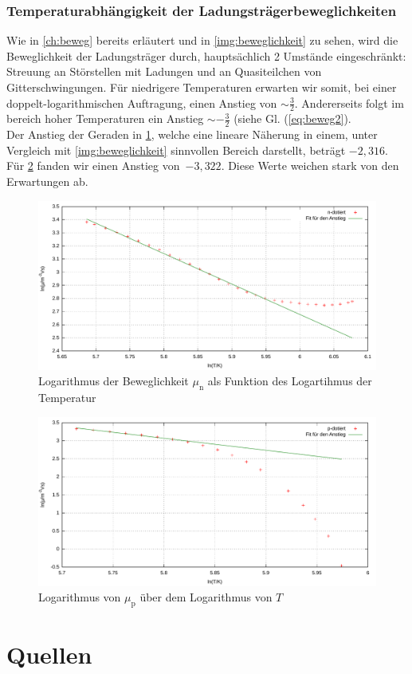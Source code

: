 \documentclass[numbers=noenddot,12pt,a4paper]{scrartcl}
\newcommand{\ix}[1]{_\text{#1}}
\begin{document}
\subsubsection{Temperaturabhängigkeit der Ladungsträgerbeweglichkeiten}
Wie in \ref{ch:beweg} bereits erläutert und in \ref{img:beweglichkeit} zu sehen, wird die Beweglichkeit der Ladungsträger durch, hauptsächlich 2 Umstände eingeschränkt: Streuung an Störstellen mit Ladungen und an Quasiteilchen von Gitterschwingungen. Für niedrigere Temperaturen erwarten wir somit, bei einer doppelt-logarithmischen Auftragung, einen Anstieg von $\sim\frac{3}{2}$. Andererseits folgt im bereich hoher Temperaturen ein Anstieg $\sim-\frac{3}{2}$ (siehe Gl. (\ref{eq:beweg2}).\\
Der Anstieg der Geraden in \ref{img:mu-n}, welche eine lineare Näherung in einem, unter Vergleich mit \ref{img:beweglichkeit} sinnvollen Bereich darstellt, beträgt $-2,316$. Für \ref{img:mu-p} fanden wir einen Anstieg \mbox{von $-3,322$.} Diese Werte weichen stark von den Erwartungen ab.
\begin{figure}[H]
	\includegraphics[width=\textwidth]{messwerte/beweglichkeitn.pdf}
	\caption{Logarithmus der Beweglichkeit $\mu\ix{n}$ als Funktion des Logartihmus der Temperatur} \label{img:mu-n}
\end{figure}
\begin{figure}[H]
	\includegraphics[width=\textwidth]{messwerte/beweglichkeitp.pdf}
	\caption{Logarithmus von $\mu\ix{p}$ über dem Logarithmus von $T$} \label{img:mu-p}
\end{figure}
\section{Quellen}
\end{document}
